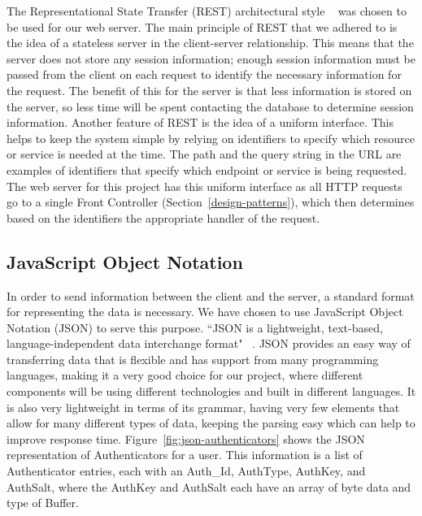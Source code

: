 \documentclass[12pt]{report}
\let\Oldsubsection\subsection
\renewcommand{\subsection}{\FloatBarrier\Oldsubsection}
\begin{document}
The Representational State Transfer (REST) architectural style ~\autocite{RESTARCHSTYLE} was chosen to be used
for our web server. The main principle of REST that we adhered to is the idea of a stateless
server in the client-server relationship. This means that the server does not store any session
information; enough session information must be passed from the client on each request to
identify the necessary information for the request. The benefit of this for the server is that less
information is stored on the server, so less time will be spent contacting the database to
determine session information. Another feature of REST is the idea of a uniform interface. This
helps to keep the system simple by relying on identifiers to specify which resource or service is
needed at the time. The path and the query string in the URL are examples of identifiers that
specify which endpoint or service is being requested. The web server for this project has this
uniform interface as all HTTP requests go to a single Front Controller (Section~\ref{design-patterns}), which
then determines based on the identifiers the appropriate handler of the request.

\subsection{JavaScript Object Notation} \label{javascript-object-notation}

In order to send information between the client and the server, a standard format for
representing the data is necessary. We have chosen to use JavaScript Object Notation (JSON) to
serve this purpose. ``JSON is a lightweight, text-based, language-independent data interchange
format" ~\autocite{JSONREF}. JSON provides an easy way of transferring data that is flexible and has support
from many programming languages, making it a very good choice for our project, where
different components will be using different technologies and built in different languages. It is
also very lightweight in terms of its grammar, having very few elements that allow for many
different types of data, keeping the parsing easy which can help to improve response time.
Figure~\ref{fig:json-authenticators} shows the JSON representation of Authenticators for a
user. This information is a list of Authenticator entries, each with an Auth\_Id, AuthType,
AuthKey, and AuthSalt, where the AuthKey and AuthSalt each have an array of byte data and type
of Buffer.
\end{document}
